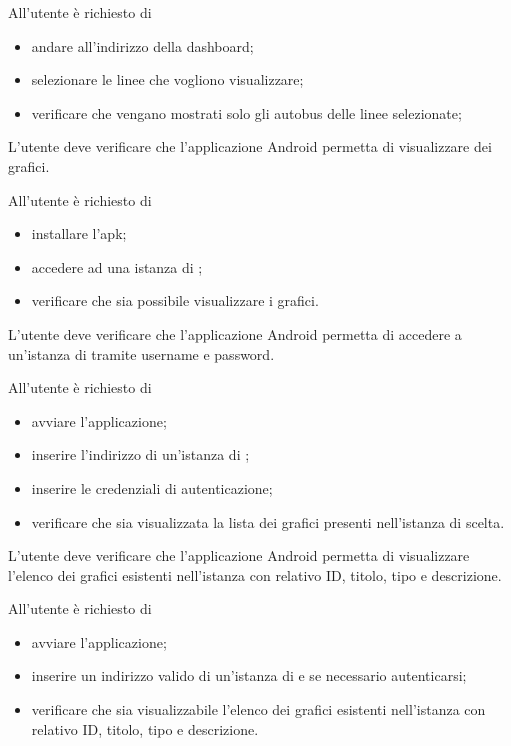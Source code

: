 		All'utente è richiesto di
		\begin{itemize}
			\item andare all'indirizzo della dashboard;
			\item selezionare le linee che vogliono visualizzare;
			\item verificare che vengano mostrati solo gli autobus delle linee selezionate;
		\end{itemize}

	L'utente deve verificare che l'applicazione Android permetta di visualizzare dei grafici.

		All'utente è richiesto di
		\begin{itemize}
			\item installare l'apk;
			\item accedere ad una istanza di \projectname{};
			\item verificare che sia possibile visualizzare i grafici.
		\end{itemize}

	L'utente deve verificare che l'applicazione Android permetta di accedere a un'istanza di \projectname{} tramite username e password.

		All'utente è richiesto di
		\begin{itemize}
			\item avviare l'applicazione;
			\item inserire l'indirizzo di un'istanza di \projectname{};
			\item inserire le credenziali di autenticazione;
			\item verificare che sia visualizzata la lista dei grafici presenti nell'istanza di \projectname{} scelta.
		\end{itemize}

	L'utente deve verificare che l'applicazione Android permetta di visualizzare l'elenco dei grafici esistenti nell'istanza \projectname{} con relativo ID, titolo, tipo e descrizione.

		All'utente è richiesto di
		\begin{itemize}
			\item avviare l'applicazione;
			\item inserire un indirizzo valido di un'istanza di \projectname{} e se necessario autenticarsi;
			\item verificare che sia visualizzabile l'elenco dei grafici esistenti nell'istanza \projectname{} con relativo ID, titolo, tipo e descrizione.
		\end{itemize}

